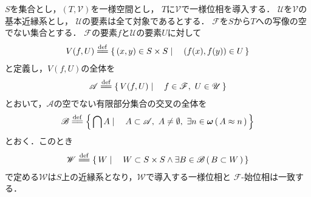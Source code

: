 	\begin{screen}
		\begin{thm}[写像の族で作る一様位相は始位相に一致する]
		\label{thm:uniform_topology_generated_by_mappings_coincides_with_initial_topology}
			$S$を集合とし，$(T,\mathscr{V})$を一様空間とし，
			$T$に$\mathscr{V}$で一様位相を導入する．
			$\mathscr{U}$を$\mathscr{V}$の基本近縁系とし，
			$\mathscr{U}$の要素は全て対象であるとする．
			$\mathscr{F}$を$S$から$T$への写像の空でない集合とする．
			$\mathscr{F}$の要素$f$と$\mathscr{U}$の要素$U$に対して
			\begin{align}
				V(f,U) \defeq \Set{(x,y) \in S \times S}{(f(x),f(y)) \in U}
			\end{align}
			と定義し，$V(f,U)$の全体を
			\begin{align}
				\mathscr{A} \defeq \Set{V(f,U)}{f \in \mathscr{F},\ U \in \mathscr{U}}
			\end{align}
			とおいて，$\mathscr{A}$の空でない有限部分集合の交叉の全体を
			\begin{align}
				\mathscr{B} \defeq \Set{\bigcap A}{A \subset \mathscr{A},\ 
				A \neq \emptyset,\ \exists n \in \Natural\, (\, A \eqp n\, )}
			\end{align}
			とおく．このとき
			\begin{align}
				\mathscr{W} \defeq 
				\Set{W}{W \subset S \times S \wedge \exists B \in \mathscr{B}\, (\, B \subset W\, )}
			\end{align}
			で定める$\mathscr{W}$は$S$上の近縁系となり，$\mathscr{W}$で導入する一様位相と
			$\mathscr{F}$-始位相は一致する．
		\end{thm}
	\end{screen}
	
